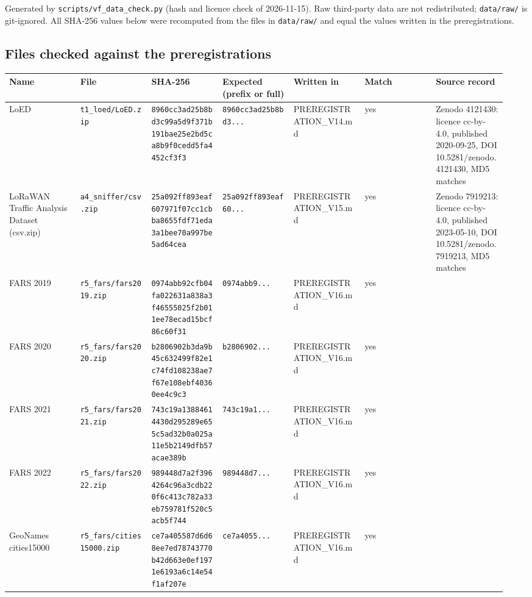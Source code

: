 


Generated by \texttt{scripts/vf\_data\_check.py} (hash and licence check of 2026-11-15). Raw third-party data are not redistributed; \texttt{data/raw/} is git-ignored. All SHA-256 values below were recomputed from the files in \texttt{data/raw/} and equal the values written in the preregistrations.

\subsection*{Files checked against the preregistrations}

{\scriptsize\raggedright
\begin{longtable}{p{0.136\linewidth}p{0.136\linewidth}p{0.136\linewidth}p{0.136\linewidth}p{0.136\linewidth}p{0.136\linewidth}p{0.136\linewidth}}
\toprule
Name & File & SHA-256 & Expected (prefix or full) & Written in & Match & Source record \\
\midrule
\endhead
LoED & \texttt{t1\_loed/LoED.zip} & \texttt{8960cc3ad25b8bd3c99a5d9f371b191bae25e2bd5ca8b9f0cedd5fa4452cf3f3} & \texttt{8960cc3ad25b8bd3...} & PREREGISTRATION\_V14.md & yes & Zenodo 4121430: licence cc-by-4.0, published 2020-09-25, DOI 10.5281/zenodo.4121430, MD5 matches \\
LoRaWAN Traffic Analysis Dataset (csv.zip) & \texttt{a4\_sniffer/csv.zip} & \texttt{25a092ff893eaf607971f07cc1cbba8655fdf71eda3a1bee70a997be5ad64cea} & \texttt{25a092ff893eaf60...} & PREREGISTRATION\_V15.md & yes & Zenodo 7919213: licence cc-by-4.0, published 2023-05-10, DOI 10.5281/zenodo.7919213, MD5 matches \\
FARS 2019 & \texttt{r5\_fars/fars2019.zip} & \texttt{0974abb92cfb04fa022631a838a3f46555025f2b011ee78ecad15bcf86c60f31} & \texttt{0974abb9...} & PREREGISTRATION\_V16.md & yes &  \\
FARS 2020 & \texttt{r5\_fars/fars2020.zip} & \texttt{b2806902b3da9b45c632499f82e1c74fd108238ae7f67e108ebf40360ee4c9c3} & \texttt{b2806902...} & PREREGISTRATION\_V16.md & yes &  \\
FARS 2021 & \texttt{r5\_fars/fars2021.zip} & \texttt{743c19a13884614430d295289e655c5ad32b0a025a11e5b2149dfb57acae389b} & \texttt{743c19a1...} & PREREGISTRATION\_V16.md & yes &  \\
FARS 2022 & \texttt{r5\_fars/fars2022.zip} & \texttt{989448d7a2f3964264c96a3cdb220f6c413c782a33eb759781f520c5acb5f744} & \texttt{989448d7...} & PREREGISTRATION\_V16.md & yes &  \\
GeoNames cities15000 & \texttt{r5\_fars/cities15000.zip} & \texttt{ce7a405587d6d68ee7ed78743770b42d663e0ef1971e6193a6c14e54f1af207e} & \texttt{ce7a4055...} & PREREGISTRATION\_V16.md & yes &  \\

\end{longtable}}

